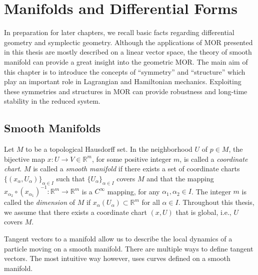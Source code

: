 \chapter{Manifolds and Differential Forms}

In preparation for later chapters, we recall basic facts regarding differential geometry and symplectic geometry. Although the applications of MOR presented in this thesis are mostly described on a linear vector space, the theory of smooth manifold can provide a great insight into the geometric MOR. The main aim of this chapter is to introduce the concepts of ``symmetry'' and ``structure'' which play an important role in Lagrangian and Hamiltonian mechanics. Exploiting these symmetries and structures in MOR can provide robustness and long-time stability in the reduced system.

\section{Smooth Manifolds}
Let $M$ to be a topological Hausdorff \cite{friedman1970foundations} set. In the neighborhood $U$ of $p\in M$, the bijective map $x:U\to V\in \mathbb R^{m}$, for some positive integer $m$, is called a \emph{coordinate chart}. $M$ is called a \emph{smooth manifold} if there exists a set of coordinate charts $\{(x_{\alpha},U_{\alpha})\}_{\alpha\in I}$ such that $\{U_{\alpha}\}_{\alpha\in I}$ covers $M$ and that the mapping $x_{\alpha_2}\circ (x_{\alpha_1})^{-1}:\mathbb R^{m} \to \mathbb R^{m}$ is a $C^{\infty}$ mapping, for any $\alpha_1,\alpha_2\in I$. The integer $m$ is called the \emph{dimension} of $M$ if $x_{\alpha}(U_{\alpha}) \subset \mathbb R^{m}$ for all $\alpha \in I$. Throughout this thesis, we assume that there exists a coordinate chart $(x,U)$ that is global, i.e., $U$ covers $M$.

Tangent vectors to a manifold allow us to describe the local dynamics of a particle moving on a smooth manifold. There are multiple ways to define tangent vectors. The most intuitive way however, uses curves defined on a smooth manifold.

